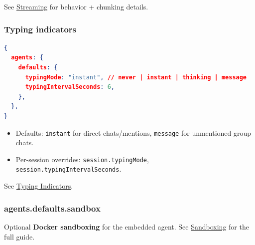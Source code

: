 See \href{/concepts/streaming}{Streaming} for behavior + chunking details.

\subsubsection{Typing indicators}


\begin{lstlisting}[language=json]
{
  agents: {
    defaults: {
      typingMode: "instant", // never | instant | thinking | message
      typingIntervalSeconds: 6,
    },
  },
}
\end{lstlisting}


\begin{itemize}
  \item Defaults: \texttt{instant} for direct chats/mentions, \texttt{message} for unmentioned group chats.
  \item Per-session overrides: \texttt{session.typingMode}, \texttt{session.typingIntervalSeconds}.
\end{itemize}


See \href{/concepts/typing-indicators}{Typing Indicators}.

\subsubsection{agents.defaults.sandbox}


Optional \textbf{Docker sandboxing} for the embedded agent. See \href{/gateway/sandboxing}{Sandboxing} for the full guide.

